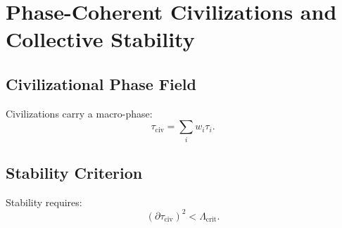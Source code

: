\chapter{Phase-Coherent Civilizations and Collective Stability}

\section{Civilizational Phase Field}
Civilizations carry a macro-phase:
\[
\tau_{\mathrm{civ}} = \sum_i w_i \tau_i.
\]

\section{Stability Criterion}
Stability requires:
\[
(\partial\tau_{\mathrm{civ}})^2 < \Lambda_{\mathrm{crit}}.
\]

